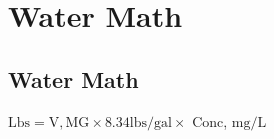 %
%
%
%
%


\chapter{Water Math}

\section{Water Math}

$\mathrm{Lbs}=\mathrm{V}, \mathrm{MG} \times 8.34 \mathrm{lbs} / \mathrm{gal} \times$ Conc, $\mathrm{mg} / \mathrm{L}$

